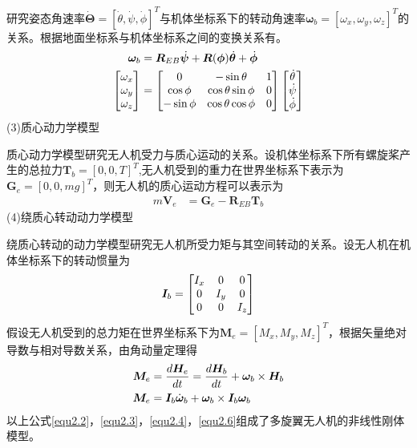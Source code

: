 研究姿态角速率$\dot{\boldsymbol{\Theta}}=[\dot{\theta},\dot{\psi},\dot{\phi}]^T$与机体坐标系下的转动角速率$\boldsymbol{\omega}_b=[\omega_x , \omega_y , \omega_z]^T$的关系。根据地面坐标系与机体坐标系之间的变换关系有。
\begin{equation}
\label{equ2.3}
\begin{aligned}
\boldsymbol{\omega}_b & = \boldsymbol{R}_{EB} \dot{\boldsymbol{\psi}}+\boldsymbol{R}(\boldsymbol{\phi}) \dot{\boldsymbol{\theta}}+ \dot{\boldsymbol{\phi}} 
\\
\begin{bmatrix}
\omega_x \cr \omega_y \cr \omega_z \cr
\end{bmatrix}
& =
\begin{bmatrix}
0 & -\sin \theta & 1 \cr
\cos \phi & \cos \theta \sin \phi & 0 \cr
-\sin \phi & \cos \theta \cos \phi & 0 \cr
\end{bmatrix}
\begin{bmatrix}
\dot{\theta} \cr \dot{\psi}  \cr  \dot{\phi} \cr
\end{bmatrix}
\end{aligned}
\end{equation}
(3)质心动力学模型

质心动力学模型研究无人机受力与质心运动的关系。设机体坐标系下所有螺旋桨产生的总拉力$\boldsymbol{T}_b=[0,0,T]^{T}$,无人机受到的重力在世界坐标系下表示为$\boldsymbol{G}_e=[0,0,mg]^T$，则无人机的质心运动方程可以表示为
\begin{equation}
\label{equ2.4}
\begin{aligned}
m\boldsymbol{V}_e &= \boldsymbol{G}_e -  \boldsymbol{R}_{EB} \boldsymbol{T}_b
\end{aligned}
\end{equation}
(4)绕质心转动动力学模型

绕质心转动的动力学模型研究无人机所受力矩与其空间转动的关系。设无人机在机体坐标系下的转动惯量为
\begin{equation}
\label{equ2.5}
\boldsymbol{I}_b = 
\begin{bmatrix}
I_x & 0 & 0 \cr
0 & I_y & 0 \cr
0 & 0 & I_z \cr
\end{bmatrix}
\end{equation}
假设无人机受到的总力矩在世界坐标系下为$\boldsymbol{M}_e=[M_x,M_y,M_z]^T$，根据矢量绝对导数与相对导数关系，由角动量定理得
\begin{equation}
\label{equ2.6}
\begin{aligned}
\boldsymbol{M}_e &= {d\boldsymbol{H}_e \over dt} = {d\boldsymbol{H}_b \over dt} +  \boldsymbol{\omega}_b \times \boldsymbol{H}_b 
\\
\boldsymbol{M}_e &= \boldsymbol{I}_b \dot{\boldsymbol{\omega}}_b +\boldsymbol{\omega}_b \times \boldsymbol{I}_b \boldsymbol{\omega}_b 
\end{aligned}
\end{equation}
以上公式\eqref{equ2.2}，\eqref{equ2.3}，\eqref{equ2.4}，\eqref{equ2.6}组成了多旋翼无人机的非线性刚体模型。

